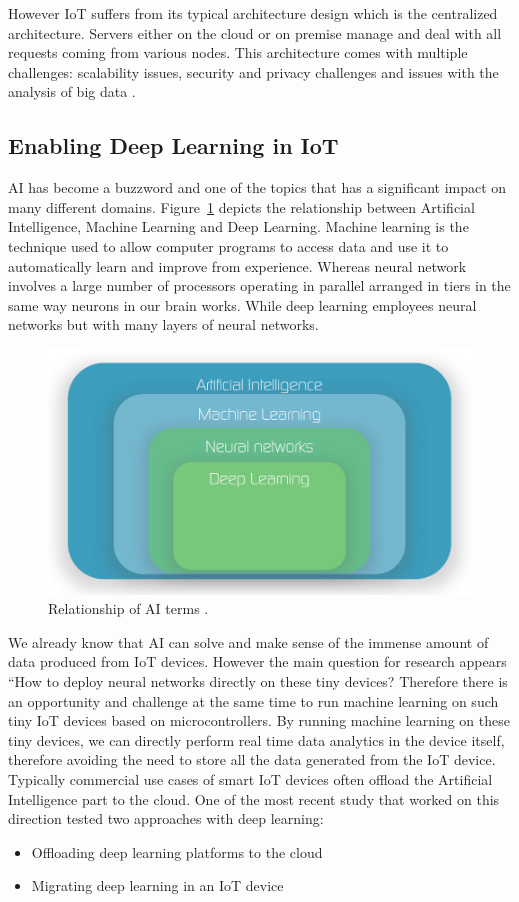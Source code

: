 However IoT suffers from its typical architecture design which is the centralized architecture. Servers either on the cloud or on premise manage and deal with all requests coming from various nodes. This architecture comes with multiple challenges: scalability issues, security and privacy challenges and issues with the analysis of big data \cite{8627114}. 

\subsection{Enabling Deep Learning in IoT}
AI has become a buzzword and one of the topics that has a significant impact on many different domains. Figure~\ref{fig:ai_terms} depicts the relationship between Artificial Intelligence, Machine Learning and Deep Learning. Machine learning is the technique used to allow computer programs to access data and use it to automatically learn and improve from experience. Whereas neural network involves a large number of processors operating in parallel arranged in tiers in the same way neurons in our brain works. While deep learning employees neural networks but with many layers of neural networks. 


\begin{figure}[!htb]
    \centering
    \includegraphics[width=1\textwidth]{figures/ai_classification.png}
    \caption{Relationship of AI terms \cite{AiMachine}.}
    \label{fig:ai_terms}
\end{figure}
We already know that AI can solve and make sense of the immense amount of data produced from IoT devices. However the main question for research appears “How to deploy neural networks directly on these tiny devices? Therefore there is an opportunity and challenge at the same time to run machine learning on such tiny IoT devices based on microcontrollers. By running machine learning on these tiny devices, we can directly perform real time data analytics in the device itself, therefore avoiding the need to store all the data generated from the IoT device. Typically commercial use cases of smart IoT devices often offload the Artificial Intelligence part to the cloud. 
One of the most recent study \cite{8057306} that worked on this direction tested two approaches with deep learning: 
\begin{itemize}
    \item Offloading deep learning platforms to the cloud
    \item Migrating deep learning in an IoT device
\end{itemize}

